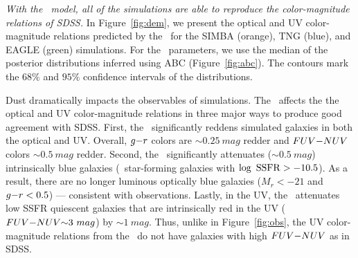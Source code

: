 \emph{With the \eda~model, all of the simulations are able to
reproduce the color-magnitude relations of SDSS.} In Figure~\ref{fig:dem}, 
we present the optical and UV color-magnitude relations predicted by the 
\eda~for the SIMBA (orange), TNG (blue), and EAGLE (green) simulations. 
For the \eda~parameters, we use the median of the posterior distributions 
inferred using ABC (Figure~\ref{fig:abc}). The contours mark the $68\%$ and 
$95\%$ confidence intervals of the distributions.


Dust dramatically impacts the observables of simulations. The \eda~affects the 
the optical and UV color-magnitude relations in three major ways to produce
good agreement with SDSS. First, the \eda~significantly reddens simulated galaxies in both 
the optical and UV.  Overall, $g{-}r$ colors are ${\sim}0.25~mag$ redder and 
$FUV{-}NUV$ colors ${\sim}0.5~mag$ redder. Second, the \eda~significantly attenuates
(${\sim}0.5~mag$) intrinsically blue galaxies (\ie~star-forming galaxies with
$\log~{\rm SSFR} > -10.5$). As a result, there are no longer luminous optically blue 
galaxies ($M_r < -21$ and $g{-}r < 0.5$) --- consistent with observations.
Lastly, in the UV, the \eda~attenuates low SSFR quiescent galaxies that are 
intrinsically red in the UV ($FUV{-}NUV{\sim}3~mag$) by ${\sim}1~mag$. Thus, unlike in
Figure~\ref{fig:obs}, the UV color-magnitude relations from the \eda~do not
have galaxies with high $FUV{-}NUV$ as in SDSS.


